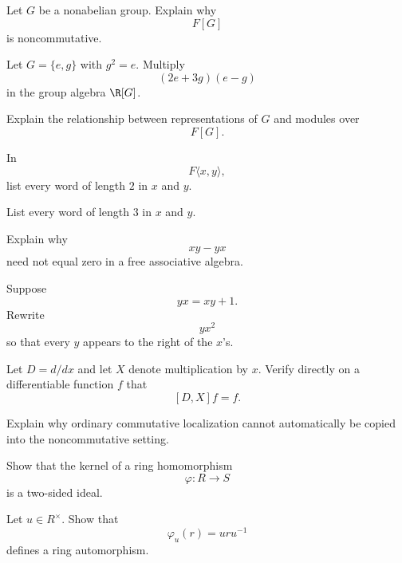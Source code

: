 \begin{exercise}[1]
Let \(G\) be a nonabelian group. Explain why
\[ F[G] \]
is noncommutative.
\end{exercise}

\begin{exercise}[2]
Let \(G=\{e,g\}\) with \(g^2=e\). Multiply
\[ (2e+3g)(e-g) \]
in the group algebra \(\R[G]\).
\end{exercise}

\begin{exercise}[2]
Explain the relationship between representations of \(G\) and modules over
\[ F[G]. \]
\end{exercise}

\begin{exercise}[1]
In
\[ F\langle x,y\rangle, \]
list every word of length \(2\) in \(x\) and \(y\).
\end{exercise}

\begin{exercise}[1]
List every word of length \(3\) in \(x\) and \(y\).
\end{exercise}

\begin{exercise}[2]
Explain why
\[ xy-yx \]
need not equal zero in a free associative algebra.
\end{exercise}

\begin{exercise}[2]
Suppose
\[ yx=xy+1. \]
Rewrite
\[ yx^2 \]
so that every \(y\) appears to the right of the \(x\)'s.
\end{exercise}

\begin{exercise}[2]
Let \(D=d/dx\) and let \(X\) denote multiplication by \(x\). Verify directly
on a differentiable function \(f\) that
\[ [D,X]f=f. \]
\end{exercise}

\begin{exercise}[2]
Explain why ordinary commutative localization cannot automatically be copied
into the noncommutative setting.
\end{exercise}

\begin{exercise}[2]
Show that the kernel of a ring homomorphism
\[ \varphi:R\to S \]
is a two-sided ideal.
\end{exercise}

\begin{exercise}[2]
Let \(u\in R^\times\). Show that
\[ \varphi_u(r)=uru^{-1} \]
defines a ring automorphism.
\end{exercise}

